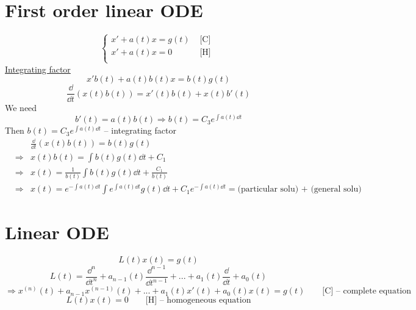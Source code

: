 \documentclass[twoside]{article}
\begin{document}


\section{First order linear ODE}
\begin{equation}
    \begin{cases}
        x'+a(t)x = g(t) &\text{ [C] }\\
        x'+a(t)x = 0    &\text{ [H] }\\
    \end{cases}
\end{equation}
\underline{Integrating factor}
\begin{equation}
     x'b(t)+a(t)b(t)x = b(t)g(t)
\end{equation}
\begin{equation}
    \frac{\dd}{\dd t} (x(t)b(t)) = x'(t)b(t) + x(t)b'(t)
\end{equation}
We need
\begin{equation}
    b'(t) = a(t)b(t) \Longrightarrow b(t) = C_3 e^{\int a(t) \dd t}
\end{equation}
Then $b(t) = C_3 e^{\int a(t) \dd t}$ -- integrating factor
\begin{eqnarray}
    &&\frac{\dd}{\dd t} (x(t)b(t)) = b(t)g(t)\\
    &\Longrightarrow& x(t)b(t) = \int b(t)g(t) \dd t + C_1\\
    &\Longrightarrow& x(t) = \frac{1}{b(t)} \int b(t)g(t) \dd t + \frac{C_1}{b(t)}\\
    &\Longrightarrow& x(t) = e^{-\int a(t) \dd t} \int e^{\int a(t) \dd t}g(t) \dd t + {C_1}e^{-\int a(t) \dd t} = \text{(particular solu) + (general solu)}
\end{eqnarray}

\section{Linear ODE}
\begin{equation}
    L(t)x(t) = g(t)
\end{equation}
\begin{equation}
    L(t) = \frac{\dd^n}{\dd t^n} + a_{n-1}(t)\frac{\dd^{n-1}}{\dd t^{n-1}} + ... + a_{1}(t)\frac{\dd}{\dd t} + a_0(t)
\end{equation}
\begin{equation}
    \Longrightarrow x^{(n)}(t)+a_{n-1}x^{(n-1)}(t) + ... + a_1(t)x'(t)+a_0(t)x(t) = g(t) \qquad \text{[C] -- complete equation}
\end{equation}
\begin{equation}
    L(t)x(t) = 0 \qquad \text{[H] -- homogeneous equation}
\end{equation}
\end{document}
